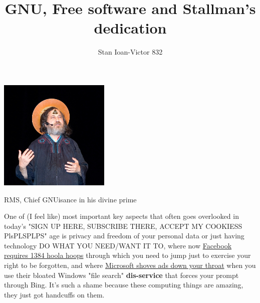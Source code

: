 \documentclass[sigplan,screen]{acmart}
\begin{document}
\title{GNU, Free software and Stallman's dedication}

\author{Stan Ioan-Victor 832}

\begin{teaserfigure}
	\includegraphics[width=200px]{pics/jesus-stallman.jpg}
	\centering
	\caption{RMS, Chief GNUisance in his divine prime}
	\label{fig:teaser}
\end{teaserfigure}

\maketitle

One of (I feel like) most important key aspects that often goes overlooked in today's "SIGN UP HERE, SUBSCRIBE THERE, ACCEPT MY COOKIESS PlsPLSPLPS" age is privacy and freedom of your personal data or just having technology DO WHAT YOU NEED/WANT IT TO, where now \href{https://www.youtube.com/watch?v=MPyJBJTHyO0}{Facebook requires 1384 hoola hoops}\cite{tantacrul} through which you need to jump just to exercise your right to be forgotten, and where \href{https://www.youtube.com/watch?v=LZzubS1ILTs}{Microsoft shoves ads down your throat}\cite{jakey} when you use their bloated Windows "file search" \textbf{dis-service}\cite{BarraDRM} that forces your prompt through Bing. It's such a shame because these computing things are amazing, they just got handcuffs on them.
\end{document}
